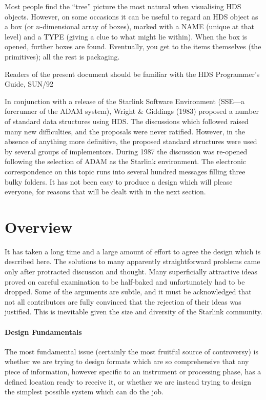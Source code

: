 \documentclass[twoside,11pt]{article}
\newcommand{\xref}[3]{#1}
\newcommand{\xlabel}[1]{}
\begin{document}
Most people find the ``tree'' picture the most natural when
visualising HDS objects.  However, on some occasions it can
be useful to regard an HDS object as a box (or $n$-dimensional
array of boxes), marked with a NAME (unique at that level)
and a TYPE (giving a clue to what might lie within).  When
the box is opened, further boxes are found.  Eventually,
you get to the items themselves (the primitives);  all the
rest is packaging.

Readers of the present document
should be familiar with the HDS Programmer's Guide, \xref{SUN/92}{sun92}.

In conjunction with a release of
the Starlink Software Environment ({\small SSE}---a forerunner of the
{\small ADAM} system),
Wright \& Giddings (1983) proposed a number of standard data structures
using HDS.  The discussions which followed raised many
new difficulties, and the proposals were never
ratified.  However, in the absence of anything more definitive,
the proposed standard structures were used by several
groups of implementors.  During 1987 the discussion was re-opened
following the selection of {\small ADAM} as the Starlink environment.  The
electronic correspondence on this topic runs into several hundred
messages filling three bulky
folders.  It has not been easy to produce a design which
will please everyone, for reasons that will be dealt with
in the next section.

\section{\xlabel{se_overview}Overview\label{se:overview}}

It has taken a long time and a large amount of effort
to agree the design which is described here.
The solutions to many apparently
straightforward problems came only after
protracted discussion and
thought.  Many superficially attractive ideas proved on careful
examination to be half-baked and unfortunately had to be dropped.
Some of the arguments are subtle, and it must be acknowledged that
not all contributors are fully convinced that the rejection
of their ideas was justified.  This is inevitable given the
size and diversity of the Starlink community.

\paragraph{Design Fundamentals}
The most fundamental issue (certainly the
most fruitful source of controversy) is whether we are
trying to design formats which are so comprehensive that
any piece of information, however specific to an instrument or
processing phase, has a defined location ready to receive
it, or whether we are instead trying to design
the simplest possible system which can do the job.
\end{document}
